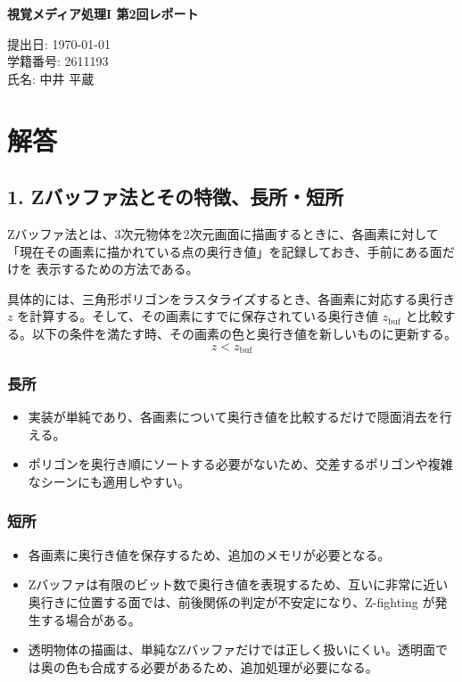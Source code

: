 \documentclass[11pt,a4paper]{ltjsarticle}
\begin{document}
\begin{center}
{\LARGE \textbf{視覚メディア処理I 第2回レポート}}
\end{center}
\vspace{1em}

\begin{flushright}
提出日: \today \\
学籍番号: 2611193 \\
氏名: 中井 平蔵
\end{flushright}

\section*{解答}

\subsection*{1. Zバッファ法とその特徴、長所・短所}

Zバッファ法とは、3次元物体を2次元画面に描画するときに、各画素に対して
「現在その画素に描かれている点の奥行き値」を記録しておき、手前にある面だけを
表示するための方法である。

具体的には、三角形ポリゴンをラスタライズするとき、各画素に対応する奥行き
$z$ を計算する。そして、その画素にすでに保存されている奥行き値 $z_{\mathrm{buf}}$
と比較する。以下の条件を満たす時、その画素の色と奥行き値を新しいものに更新する。
\[
z < z_{\mathrm{buf}}
\]

\subsubsection*{長所}
\begin{itemize}
  \item 実装が単純であり、各画素について奥行き値を比較するだけで隠面消去を行える。
  \item ポリゴンを奥行き順にソートする必要がないため、交差するポリゴンや複雑なシーンにも適用しやすい。
\end{itemize}

\subsubsection*{短所}
\begin{itemize}
  \item 各画素に奥行き値を保存するため、追加のメモリが必要となる。
  \item Zバッファは有限のビット数で奥行き値を表現するため、互いに非常に近い奥行きに位置する面では、前後関係の判定が不安定になり、Z-fighting が発生する場合がある。
  \item 透明物体の描画は、単純なZバッファだけでは正しく扱いにくい。透明面では奥の色も合成する必要があるため、追加処理が必要になる。
\end{itemize}
\end{document}
